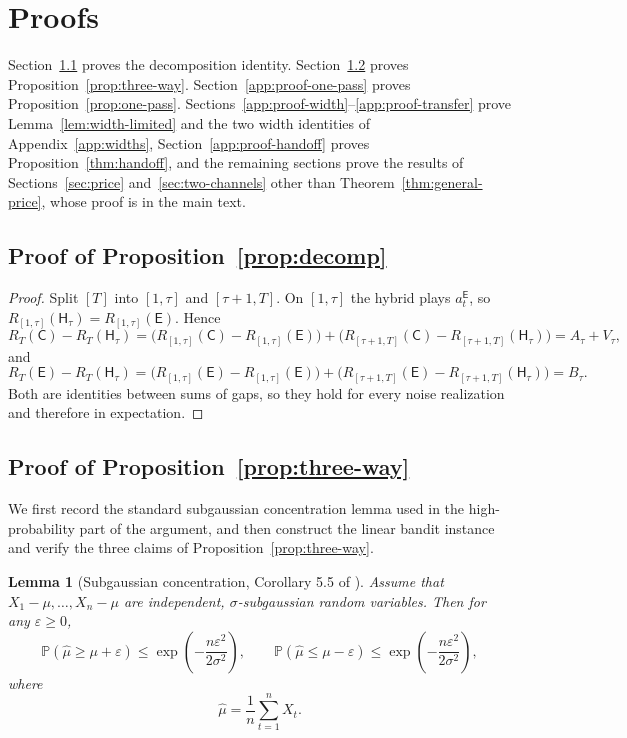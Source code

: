 \documentclass{article}
\newtheorem{lemma}{Lemma}
\theoremstyle{definition}
\theoremstyle{remark}
\theoremstyle{remark}
\newcommand{\Cold}{\mathsf{C}}
\newcommand{\Exp}{\mathsf{E}}
\newcommand{\Hyb}{\mathsf{H}}
\begin{document}
\section{Proofs}
\label{app:proofs}

Section~\ref{app:proof-decomp} proves the decomposition identity.
Section~\ref{app:proof-three-way} proves
Proposition~\ref{prop:three-way}.
Section~\ref{app:proof-one-pass} proves Proposition~\ref{prop:one-pass}.
Sections~\ref{app:proof-width}--\ref{app:proof-transfer} prove
Lemma~\ref{lem:width-limited} and the two width identities of
Appendix~\ref{app:widths}, Section~\ref{app:proof-handoff} proves
Proposition~\ref{thm:handoff}, and the remaining sections prove the results of
Sections~\ref{sec:price} and~\ref{sec:two-channels} other than
Theorem~\ref{thm:general-price}, whose proof is in the main text.

\subsection{Proof of Proposition~\ref{prop:decomp}}
\label{app:proof-decomp}

\begin{proof}
Split $[T]$ into $[1,\tau]$ and $[\tau+1,T]$. On $[1,\tau]$ the hybrid plays
$a_t^{\Exp}$, so $R_{[1,\tau]}(\Hyb_\tau)=R_{[1,\tau]}(\Exp)$. Hence
\[
R_T(\Cold)-R_T(\Hyb_\tau)
=\bigl(R_{[1,\tau]}(\Cold)-R_{[1,\tau]}(\Exp)\bigr)
+\bigl(R_{[\tau+1,T]}(\Cold)-R_{[\tau+1,T]}(\Hyb_\tau)\bigr)
=A_\tau+V_\tau ,
\]
and
\[
R_T(\Exp)-R_T(\Hyb_\tau)
=\bigl(R_{[1,\tau]}(\Exp)-R_{[1,\tau]}(\Exp)\bigr)
+\bigl(R_{[\tau+1,T]}(\Exp)-R_{[\tau+1,T]}(\Hyb_\tau)\bigr)
=B_\tau .
\]
Both are identities between sums of gaps, so they hold for every noise
realization and therefore in expectation.
\end{proof}

\subsection{Proof of Proposition~\ref{prop:three-way}}
\label{app:proof-three-way}

We first record the standard subgaussian concentration lemma used in the
high-probability part of the argument, and then construct the linear bandit
instance and verify the three claims of Proposition~\ref{prop:three-way}.

\begin{lemma}[Subgaussian concentration, Corollary 5.5 of \cite{lattimore2020bandit}]
\label{lem:subgaussian}
Assume that $X_1-\mu,\dots,X_n-\mu$ are independent, $\sigma$-subgaussian random variables. Then for any $\varepsilon \ge 0$,
\[
\mathbb{P}\!\left(\hat{\mu} \ge \mu+\varepsilon\right)
\le
\exp\!\left(-\frac{n\varepsilon^2}{2\sigma^2}\right),
\qquad
\mathbb{P}\!\left(\hat{\mu} \le \mu-\varepsilon\right)
\le
\exp\!\left(-\frac{n\varepsilon^2}{2\sigma^2}\right),
\]
where
\[
\hat{\mu}=\frac{1}{n}\sum_{t=1}^n X_t.
\]
\end{lemma}
\end{document}
